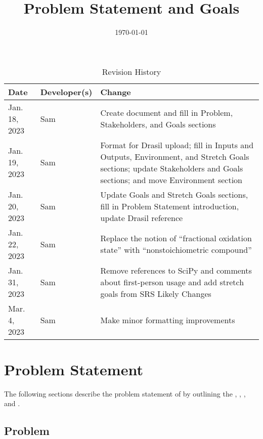 \documentclass{article}
\title{Problem Statement and Goals\\\progname}
\author{\authname}
\date{\today}
\begin{document}
\maketitle

\begin{table}[hp]
	\caption{Revision History} \label{TblRevisionHistory}
	\begin{tabularx}{\textwidth}{llX}
		\toprule
		\textbf{Date} & \textbf{Developer(s)} & \textbf{Change}              \\
		\midrule
		Jan. 18, 2023 & Sam                   & Create document and fill in
		Problem, Stakeholders, and Goals sections                            \\
		Jan. 19, 2023 & Sam                   & Format for Drasil upload;
		fill in Inputs and Outputs, Environment, and Stretch Goals sections;
		update Stakeholders and Goals sections; and move Environment section \\
		Jan. 20, 2023 & Sam                   & Update Goals and Stretch
		Goals sections, fill in Problem Statement introduction, update
		Drasil reference                                                     \\
		Jan. 22, 2023 & Sam                   & Replace the notion of
		``fractional oxidation state'' with ``nonstoichiometric compound''   \\
		Jan. 31, 2023 & Sam                   & Remove references to SciPy
		and comments about first-person usage and add stretch goals from SRS
		Likely Changes                                                       \\
		Mar. 4, 2023  & Sam                   & Make minor formatting
		improvements                                                         \\
		\bottomrule
	\end{tabularx}
\end{table}

\section{Problem Statement}

The following sections describe the problem statement of \progname{}
by outlining the , , , and
.

\subsection{Problem} \label{prob}
\end{document}
